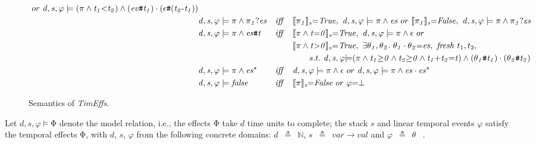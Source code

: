 \documentclass[acmsmall,10pt,review]{acmart}
\newcommand{\es}{\theta}
\newcommand{\ev}{ev}
\newcommand{\timedEffects}{\emph{TimEffs}}
\newcommand{\effect}{{\ensuremath{\mathrm{\Phi}}}}
\newcommand{\code}[1]{{\tt{\ensuremath{\m{#1}}}}}
\newcommand{\m}{\mathit}
\newcommand{\mysharp}{{\mathrel{\texttt{\#}}}}
\def\defeq{\ensuremath{\,\triangleq}}
\begin{document}
{\begin{figure}[!ht]
\begin{align*}
\ or\ \code{d, s, \varphi \models {(\pi \wedge t_1 {<}t_2)}  \wedge (\ev\mysharp t_1) \cdot (\epsilon \mysharp  (t_2\text{-}t_1))  } \\
&\code{d, s, \varphi \models {\pi} \wedge \pi_1 ? es}  &\m{iff}\quad & 
\code{\llbracket \pi_1  \rrbracket_{s} {=}  
 {True} }, \ \code{d, s, \varphi \models {\pi}  \wedge es}\ or  \ 
  \code{\llbracket \pi_1 \rrbracket_{s} {=}  
{False} }, 
\  \code{d, s, \varphi \models {\pi} \wedge \pi_1 ? es}\\
&\code{d, s, \varphi \models {\pi}  \wedge es\mysharp  t}  &\m{iff}\quad &
 \code{\llbracket {\pi}  \wedge t {=} 0 \rrbracket_{s} {=}  
 {True} }, \ \code{d, s, \varphi \models {\pi}  \wedge  \epsilon}\ or  \\
& & &  \code{\llbracket {\pi}\wedge t {>} 0 \rrbracket_{s} {=}  
{True} }, 
\  \exists \code{\es_1,\es_2}. \  \code{\es_1  \cdot  \es_2 {=} es}, \  \m{fresh}\ t_1, t_2,\\
&&& \qquad  s.t. \ \code{d, s, \varphi {\models} {(\pi 
 \wedge  t_1{\geq}0 \wedge t_2{\geq}0  \wedge  t_1{+} t_2{=}t)} \wedge 
(\es_1\mysharp t_1)  \cdot  (\es_2\mysharp t_2) } \\
&\code{d, s, \varphi \models {\pi}\wedge es^\star}  &\m{iff}\quad & 
\code{d, s, \varphi \models {\pi}  \wedge  \epsilon}\ or \ 
\code{d, s, \varphi \models {\pi}  \wedge es  \cdot  es^\star}\\
& \code{d, s, \varphi \models false}  &\m{iff}\quad &
 \code{\llbracket {\pi}  \rrbracket_{s} {=} {False} } \ or \ \code{\varphi {=} \bot }
\end{align*}
\caption{Semantics of \timedEffects.}
\label{fig:Sementic}
\end{figure}



Let \code{d, s, \varphi \models \effect} denote the model relation, i.e., 
the effects \code{\effect} take \code{d} time units to complete; 
the stack \code{s} and linear temporal events \code{\varphi} satisfy the 
temporal effects \code{\effect}, with \code{d}, \code{s}, \code{\varphi} 
from the following concrete domains: \code{d}  {\defeq}\  \code{\mathbb{N}}, 
\code{s}  \defeq\  \code{var {\rightarrow} val } and \code{\varphi}   \defeq\ \code{\es} \ .



}
\end{document}
